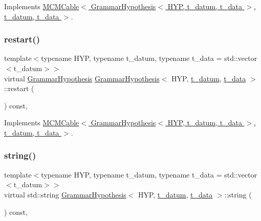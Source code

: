Implements \hyperlink{class_m_c_m_cable_ab119a14256ab92c5c1e941f8492df830}{M\+C\+M\+Cable$<$ Grammar\+Hypothesis$<$ H\+Y\+P, t\+\_\+datum, t\+\_\+data $>$, t\+\_\+datum, t\+\_\+data $>$}.

\mbox{\label{class_grammar_hypothesis_a8d0042f4858879ce2585df382ce78b0a}} 
\subsubsection{\texorpdfstring{restart()}{restart()}}
{\footnotesize\ttfamily template$<$typename H\+YP, typename t\+\_\+datum, typename t\+\_\+data = std\+::vector$<$t\+\_\+datum$>$$>$ \\
virtual \hyperlink{class_grammar_hypothesis}{Grammar\+Hypothesis} \hyperlink{class_grammar_hypothesis}{Grammar\+Hypothesis}$<$ H\+YP, \hyperlink{class_bayesable_a7c93a2eeab708378eb321745908718d4}{t\+\_\+datum}, \hyperlink{class_bayesable_a70a593a67c7d43239ecc06bb4fd06a6b}{t\+\_\+data} $>$\+::restart (\begin{DoxyParamCaption}{ }\end{DoxyParamCaption}) const\hspace{0.3cm}{\ttfamily [inline]}, {\ttfamily [virtual]}}



Implements \hyperlink{class_m_c_m_cable_a220d6c4ca73e20441c14fa5bd3e090d3}{M\+C\+M\+Cable$<$ Grammar\+Hypothesis$<$ H\+Y\+P, t\+\_\+datum, t\+\_\+data $>$, t\+\_\+datum, t\+\_\+data $>$}.

\mbox{\label{class_grammar_hypothesis_a75267d7b68cd9b3634f84a464877c07c}} 
\subsubsection{\texorpdfstring{string()}{string()}}
{\footnotesize\ttfamily template$<$typename H\+YP, typename t\+\_\+datum, typename t\+\_\+data = std\+::vector$<$t\+\_\+datum$>$$>$ \\
virtual std\+::string \hyperlink{class_grammar_hypothesis}{Grammar\+Hypothesis}$<$ H\+YP, \hyperlink{class_bayesable_a7c93a2eeab708378eb321745908718d4}{t\+\_\+datum}, \hyperlink{class_bayesable_a70a593a67c7d43239ecc06bb4fd06a6b}{t\+\_\+data} $>$\+::string (\begin{DoxyParamCaption}{ }\end{DoxyParamCaption}) const\hspace{0.3cm}{\ttfamily [inline]}, {\ttfamily [virtual]}}



